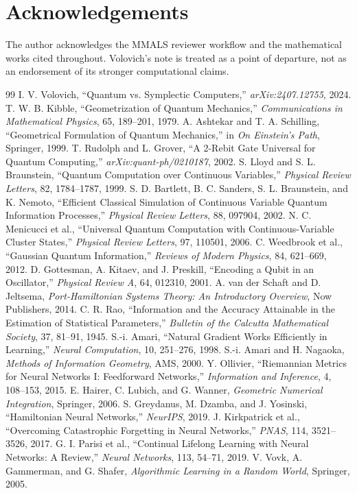 \documentclass[11pt]{article}
\theoremstyle{definition}\newtheorem{definition}{Definition}\newtheorem{assumption}{Assumption}
\theoremstyle{remark}\newtheorem{remark}{Remark}
\begin{document}
\section*{Acknowledgements}
The author acknowledges the MMALS reviewer workflow and the mathematical works cited throughout. Volovich's note is treated as a point of departure, not as an endorsement of its stronger computational claims.

\begin{thebibliography}{99}
 I. V. Volovich, ``Quantum vs. Symplectic Computers,'' \emph{arXiv:2407.12755}, 2024.
 T. W. B. Kibble, ``Geometrization of Quantum Mechanics,'' \emph{Communications in Mathematical Physics}, 65, 189--201, 1979.
 A. Ashtekar and T. A. Schilling, ``Geometrical Formulation of Quantum Mechanics,'' in \emph{On Einstein's Path}, Springer, 1999.
 T. Rudolph and L. Grover, ``A 2-Rebit Gate Universal for Quantum Computing,'' \emph{arXiv:quant-ph/0210187}, 2002.
 S. Lloyd and S. L. Braunstein, ``Quantum Computation over Continuous Variables,'' \emph{Physical Review Letters}, 82, 1784--1787, 1999.
 S. D. Bartlett, B. C. Sanders, S. L. Braunstein, and K. Nemoto, ``Efficient Classical Simulation of Continuous Variable Quantum Information Processes,'' \emph{Physical Review Letters}, 88, 097904, 2002.
 N. C. Menicucci et al., ``Universal Quantum Computation with Continuous-Variable Cluster States,'' \emph{Physical Review Letters}, 97, 110501, 2006.
 C. Weedbrook et al., ``Gaussian Quantum Information,'' \emph{Reviews of Modern Physics}, 84, 621--669, 2012.
 D. Gottesman, A. Kitaev, and J. Preskill, ``Encoding a Qubit in an Oscillator,'' \emph{Physical Review A}, 64, 012310, 2001.
 A. van der Schaft and D. Jeltsema, \emph{Port-Hamiltonian Systems Theory: An Introductory Overview}, Now Publishers, 2014.
 C. R. Rao, ``Information and the Accuracy Attainable in the Estimation of Statistical Parameters,'' \emph{Bulletin of the Calcutta Mathematical Society}, 37, 81--91, 1945.
 S.-i. Amari, ``Natural Gradient Works Efficiently in Learning,'' \emph{Neural Computation}, 10, 251--276, 1998.
 S.-i. Amari and H. Nagaoka, \emph{Methods of Information Geometry}, AMS, 2000.
 Y. Ollivier, ``Riemannian Metrics for Neural Networks I: Feedforward Networks,'' \emph{Information and Inference}, 4, 108--153, 2015.
 E. Hairer, C. Lubich, and G. Wanner, \emph{Geometric Numerical Integration}, Springer, 2006.
 S. Greydanus, M. Dzamba, and J. Yosinski, ``Hamiltonian Neural Networks,'' \emph{NeurIPS}, 2019.
 J. Kirkpatrick et al., ``Overcoming Catastrophic Forgetting in Neural Networks,'' \emph{PNAS}, 114, 3521--3526, 2017.
 G. I. Parisi et al., ``Continual Lifelong Learning with Neural Networks: A Review,'' \emph{Neural Networks}, 113, 54--71, 2019.
 V. Vovk, A. Gammerman, and G. Shafer, \emph{Algorithmic Learning in a Random World}, Springer, 2005.
\end{thebibliography}
\end{document}
